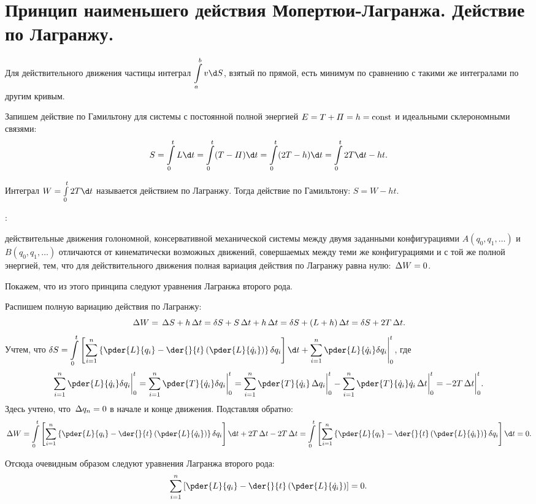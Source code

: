 \chapter{Принцип наименьшего действия Мопертюи-Лагранжа. Действие по Лагранжу.}

Для действительного движения частицы интеграл \( \ds \int\limits_a^b v\d S \),
взятый по прямой, есть минимум по сравнению с такими же интегралами по другим кривым.

Запишем действие по Гамильтону для системы с постоянной полной энергией
\( E = T + \varPi = h = \mathrm{const} \) и идеальными склерономными связями:
\[
    S = \int\limits_0^t L\d t = \int\limits_0^t (T - \varPi)\d t =
    \int\limits_0^t (2T - h)\d t = \int\limits_0^t 2T\d t - ht.
\]

Интеграл \( W = \int\limits_0^t 2T\d t \) называется действием по Лагранжу.
Тогда действие по Гамильтону: \( S = W - ht \).

:

действительные движения голономной, консервативной механической системы между
двумя заданными конфигурациями \( A(q_0, q_1, \ldots) \) и \( B(q_0, q_1,
\ldots) \) отличаются от кинематически возможных движений, совершаемых между
теми же конфигурациями и с той же полной энергией, тем, что для действительного
движения полная вариация действия по Лагранжу равна нулю: \( \,\Delta W = 0 \).

Покажем, что из этого принципа следуют уравнения Лагранжа второго рода.

Распишем полную вариацию действия по Лагранжу:
\[
    \,\Delta W = \,\Delta S + h\,\Delta t = \delta S + S\,\Delta t + h\,\Delta t = \delta S + (L + h)\,\Delta t =
    \delta S + 2T\,\Delta t.
\]
Учтем, что \( \ds
    \delta S = \int\limits_0^t \left[\sum\limits_{i=1}^n \left\{\pder{L}{q_i} -
    \der{}{t}\left(\pder{L}{\dot{q}_i}\right)\right\}\delta q_i\right]\d t +
    \sum\limits_{i=1}^n \pder{L}{\dot{q}_i}\delta q_i\Biggr|_0^t \),
где
\[
    \sum\limits_{i=1}^n \pder{L}{\dot{q}_i}\delta q_i\biggr|_0^t =
    \sum\limits_{i=1}^n \pder{T}{\dot{q}_i}\delta q_i\biggr|_0^t =
    \sum\limits_{i=1}^n \pder{T}{\dot{q}_i}\D q_i\biggr|_0^t -
    \sum\limits_{i=1}^n \pder{T}{\dot{q}_i}\dot{q}_i\D t\biggr|_0^t =
    -2T\D t\biggr|_0^t.
\]
Здесь учтено, что \( \,\Delta q_n = 0 \) в начале и конце движения. Подставляя
обратно:
\[
    \D W = \int\limits_0^t \left[\sum\limits_{i=1}^n \left\{\pder{L}{q_i} -
    \der{}{t}\left(\pder{L}{\dot{q}_i}\right)\right\}\delta q_i\right]\d t +
    2T\D t - 2T\D t = \int\limits_0^t \left[\sum\limits_{i=1}^n \left\{\pder{L}{q_i} -
    \der{}{t}\left(\pder{L}{\dot{q}_i}\right)\right\}\delta q_i\right]\d t = 0.
\]

Отсюда очевидным образом следуют уравнения Лагранжа второго рода:
\[
    \sum\limits_{i=1}^n \left[\pder{L}{q_i} - \der{}{t}\left(\pder{L}{\dot{q}_i}
    \right)\right] = 0.
\]

\newpage
